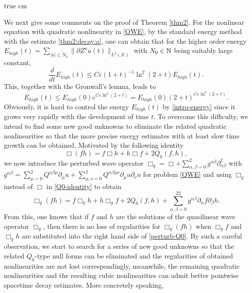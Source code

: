 \documentclass[11pt,twoside]{article}
\def\cK{\mathcal K}
\def\ds{\displaystyle}
\def\p{\partial}
\def\ve{\varepsilon}
\theoremstyle{plain}
\theoremstyle{definition}
\numberwithin{equation}{section}
\begin{document}
 true cm

We next give some comments on the proof of Theorem \ref{thm2}.
For the nonlinear equation with quadratic nonlinearity in \eqref{QWE}, by the standard energy method with the estimate \eqref{thm2:decay:a},
one can obtain that for the higher order energy $\ds E_{high}(t)=\sum_{|a|\le N_0}\|\p Z^au(t)\|_{L^2(\cK)}$
with $N_0\in\Bbb N$ being suitably large constant,
\begin{equation}\label{intro-energy-ineq}
\frac{d}{dt}E_{high}(t)\le C\ve(1+t)^{-1}\ln^2(2+t)E_{high}(t).
\end{equation}
This, together with the Gronwall's lemma,  leads to
\begin{equation}\label{intro-energy}
E_{high}(t)\le E_{high}(0)e^{C\ve\ln^3(2+t)}=E_{high}(0)(2+t)^{C\ve\ln^2(2+t)}.
\end{equation}
Obviously, it is hard to control the energy $E_{high}(t)$ by \eqref{intro-energy} since it grows very rapidly with the development
of time $t$.
To overcome this difficulty, we intend to find some new good unknowns to eliminate the related quadratic nonlinearities
so that the more precise energy estimates with at least slow time growth can be obtained.
Motivated by the following identity
\begin{equation}\label{Q0-identity}
\Box(fh)=f\Box h+h\Box f+2Q_0(f,h),
\end{equation}
we now introduce the perturbed wave operator $\ds\Box_g=\Box+\sum_{\alpha,\beta=0}^2g^{\alpha\beta}\p^2_{\alpha\beta}$
with $\ds g^{\alpha\beta}=\sum_{\mu=0}^2Q^{\alpha\beta\mu}\p_{\mu}u
+\sum_{\mu,\nu=0}^2Q^{\alpha\beta\mu\nu}\p_{\mu}u\p_{\nu}u$ for problem \eqref{QWE}
and using $\Box_g$ instead of $\Box$ in \eqref{Q0-identity} to obtain
\begin{equation}\label{perturb-Q0}
\Box_g(fh)=f\Box_gh+h\Box_gf+2Q_0(f,h)+\sum_{\alpha,\beta=0}^22g^{\alpha\beta}\p_{\alpha}f\p_{\beta}h.
\end{equation}
From this, one knows that if $f$ and $h$ are the solutions of the quasilinear wave operator $\Box_g$,
then there is no loss of regularities for $\Box_g(fh)$ when $\Box_gf$ and $\Box_gh$ are substituted into the right
hand side of \eqref{perturb-Q0}.
By such a careful observation,  we start to search for a series of new good unknowns
so that  the related  $Q_0$-type null forms can be eliminated and the regularities of obtained nonlinearities
are not lost correspondingly, meanwhile, the remaining quadratic nonlinearities
and the resulting cubic nonlinearities can admit better pointwise spacetime decay estimates. More concretely speaking,
\end{document}
